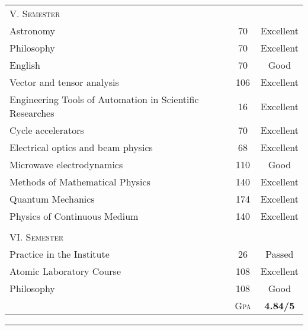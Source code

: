 \documentclass[a4paper,12pt]{article}
\begin{document}
\begin{center}
\begin{tabular}{lcc}
\textsc{V. Semester}\\
Astronomy   &70     &Excellent\\
Philosophy  &70     &Excellent\\
English     &70     &Good\\
Vector and tensor analysis  &106    &Excellent\\
Engineering Tools of Automation in Scientific Researches    &16    &Excellent\\
Cycle accelerators  &70     &Excellent\\
Electrical optics and beam physics  &68     &Excellent\\
Microwave electrodynamics   &110    &Good\\
Methods of Mathematical Physics     &140    &Excellent\\
Quantum Mechanics   &174    &Excellent\\
Physics of Continuous Medium        &140    &Excellent\\
\\

\textsc{VI. Semester}\\	
Practice in the Institute   &26     &Passed\\
Atomic Laboratory Course    &108    &Excellent\\
Philosophy      &108    &Good\\
\cline{2-3}
&\textsc{Gpa}&\textbf{4.84/5}
\end{tabular}
\end{center}
\bigskip
\hrule
\bigskip
\end{document}
